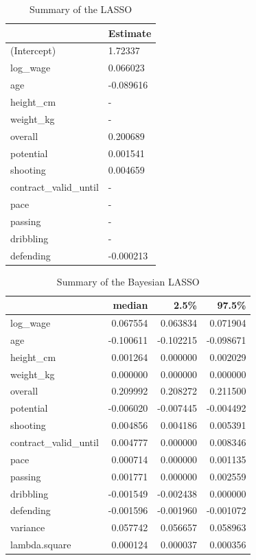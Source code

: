 \documentclass[12pt,a4paper]{article}
\begin{document}
\begin{table}

\caption{\label{tab:unnamed-chunk-5}\label{tab:sum_lasso} Summary of the LASSO }
\centering
\begin{tabular}[t]{ll}
\toprule
  & Estimate\\
\midrule
\rowcolor{gray!6}  (Intercept) & 1.72337\\
log\_wage & 0.066023\\
\rowcolor{gray!6}  age & -0.089616\\
height\_cm & -\\
\rowcolor{gray!6}  weight\_kg & -\\
overall & 0.200689\\
\rowcolor{gray!6}  potential & 0.001541\\
shooting & 0.004659\\
\rowcolor{gray!6}  contract\_valid\_until & -\\
pace & -\\
\rowcolor{gray!6}  passing & -\\
dribbling & -\\
\rowcolor{gray!6}  defending & -0.000213\\
\bottomrule
\end{tabular}
\end{table}

\begin{table}

\caption{\label{tab:unnamed-chunk-6}\label{tab:sum_bay} Summary of the Bayesian LASSO }
\centering
\begin{tabular}[t]{lrrr}
\toprule
  & median & 2.5\% & 97.5\%\\
\midrule
\rowcolor{gray!6}  log\_wage & 0.067554 & 0.063834 & 0.071904\\
age & -0.100611 & -0.102215 & -0.098671\\
\rowcolor{gray!6}  height\_cm & 0.001264 & 0.000000 & 0.002029\\
weight\_kg & 0.000000 & 0.000000 & 0.000000\\
\rowcolor{gray!6}  overall & 0.209992 & 0.208272 & 0.211500\\
potential & -0.006020 & -0.007445 & -0.004492\\
\rowcolor{gray!6}  shooting & 0.004856 & 0.004186 & 0.005391\\
contract\_valid\_until & 0.004777 & 0.000000 & 0.008346\\
\rowcolor{gray!6}  pace & 0.000714 & 0.000000 & 0.001135\\
passing & 0.001771 & 0.000000 & 0.002559\\
\rowcolor{gray!6}  dribbling & -0.001549 & -0.002438 & 0.000000\\
defending & -0.001596 & -0.001960 & -0.001072\\
\rowcolor{gray!6}  variance & 0.057742 & 0.056657 & 0.058963\\
lambda.square & 0.000124 & 0.000037 & 0.000356\\
\bottomrule
\end{tabular}
\end{table}
\end{document}
